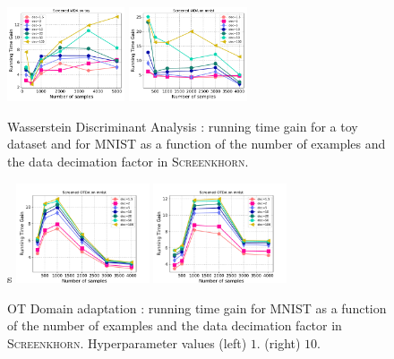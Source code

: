 \begin{figure}[t]
	\centering
	\includegraphics[width=0.31\textwidth]{./figs/wda_gain_toy.pdf}\hspace{1.5cm}
	\includegraphics[width=0.31\textwidth]{./figs/wda_gain_mnist.pdf}

	\caption{Wasserstein Discriminant Analysis : running time gain for a toy dataset and for MNIST as a function of the number of examples and the data decimation factor in \textsc{Screenkhorn}.}
	\label{fig:wda}
\end{figure}
\begin{figure}[t]
	\centering
s	\includegraphics[width=0.35\textwidth]{./figs/da_gain_mnist_regcl1.pdf}\hspace{1cm}
	\includegraphics[width=0.35\textwidth]{./figs/da_gain_mnist_regcl10.pdf}
	\caption{OT Domain adaptation : running time gain  for MNIST as a function of the number of examples and the data decimation factor in \textsc{Screenkhorn}. Hyperparameter values (left) $1$. (right) $10$.}
	\label{fig:otda}
\end{figure}

